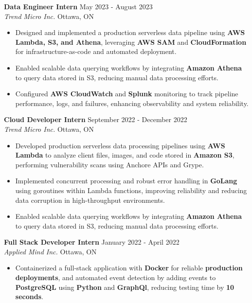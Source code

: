 \documentclass[a4paper]{article}
\begin{document}
\textbf{Data Engineer Intern} \hfill May 2023 - August 2023\\
\textit{Trend Micro Inc.} \hfill Ottawa, ON\\
\vspace{-2mm}
\begin{itemize} \itemsep -4pt

\item Designed and implemented a production serverless data pipeline using \textbf{AWS Lambda, S3, and Athena}, leveraging \textbf{AWS SAM} and \textbf{CloudFormation} for infrastructure-as-code and automated deployment.

\item Enabled scalable data querying workflows by integrating \textbf{Amazon Athena} to query data stored in S3, reducing manual data processing efforts.

\item Configured \textbf{AWS CloudWatch} and \textbf{Splunk} monitoring to track pipeline performance, logs, and failures, enhancing observability and system reliability.

\end{itemize}

\textbf{Cloud Developer Intern} \hfill September 2022 - December 2022\\
\textit{Trend Micro Inc.} \hfill Ottawa, ON\\
\vspace{-2mm}
\begin{itemize} \itemsep -4pt

\item Developed production serverless data processing pipelines using \textbf{AWS Lambda} to analyze client files, images, and code stored in \textbf{Amazon S3}, performing vulnerability scans using Anchore APIs and Grype.

\item Implemented concurrent processing and robust error handling in \textbf{GoLang} using goroutines within Lambda functions, improving reliability and reducing data corruption in high-throughput environments.

\item Enabled scalable data querying workflows by integrating \textbf{Amazon Athena} to query data stored in S3, reducing manual data processing efforts.

\end{itemize}

\textbf{Full Stack Developer Intern} \hfill January 2022 - April 2022\\
\textit{Applied Mind Inc.} \hfill Ottawa, ON\\
\vspace{-2mm}
\begin{itemize} \itemsep -4pt
\item Containerized a full-stack application with \textbf{Docker} for reliable \textbf{production deployments}, and automated event detection by adding events to \textbf{PostgreSQL} using \textbf{Python} and \textbf{GraphQl}, reducing testing time by \textbf{10 seconds}.
\end{itemize}

\vspace{5mm}
\vspace*{-1mm}
\vspace*{5mm}
\end{document}
